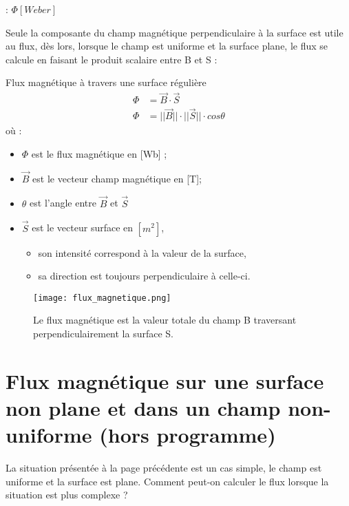 \begin{encadre}
     : \(\Phi [Weber]\)
\end{encadre}

Seule la composante du champ magnétique perpendiculaire à la surface est utile au flux, dès lors, lorsque le champ est uniforme et la surface plane, le flux se calcule en faisant le produit scalaire entre B et S :

\begin{encadre_equation*}{Flux magnétique à travers une surface régulière}
    \begin{equation}
        \begin{split}
            \Phi & = \vec{B} \cdot \vec{S} \\
            \Phi & = ||\vec{B}|| \cdot ||\vec{S}|| \cdot cos \theta
        \end{split}
    \end{equation} où :
    \begin{itemize}[label=\textbullet]
        \item \( \Phi \)  est le flux magnétique en [Wb] ;
        \item \( \vec{B} \) est le vecteur champ magnétique en [T];
        \item \( \theta\) est l'angle entre \( \vec{B} \) et \( \vec{S} \)
        \item \( \vec{S} \) est le vecteur surface en \([m^2]\),
              \begin{itemize}
                  \item son intensité correspond à la valeur de la surface,
                  \item sa direction est toujours perpendiculaire à celle-ci.
              \end{itemize}
    \end{itemize}
\end{encadre_equation*}

\begin{figure}[h]
    \centering
    \texttt{[image: flux\_magnetique.png]}
    \caption{Le flux magnétique est la valeur totale du champ B traversant perpendiculairement la surface S.}
    \label{flux_magnetique}
\end{figure}

\newpage

\section{Flux magnétique sur une surface non plane et dans un champ non-uniforme (hors programme)}
La situation présentée à la page précédente est un cas simple, le champ est uniforme et la surface est plane. Comment peut-on calculer le flux lorsque la situation est plus complexe ?

